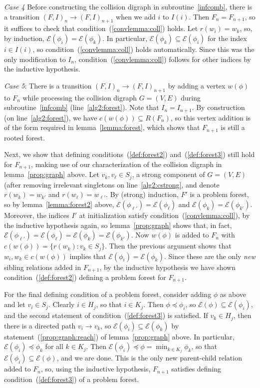 \documentclass[11pt,reqno]{amsart}
\theoremstyle{definition}
\numberwithin{equation}{section}
\newcommand{\pre}{\phi}
\newcommand{\sub}{\subseteq}
\newcommand{\fix}{\mathcal{E}}
\newcommand{\peq}{\preceq}
\newcommand{\strongcomp}{S}
\newcommand{\coll}{I}
\newcommand{\reach}{H}
\newcommand{\forest}{F}
\newcommand{\pair}{(F,I)}
\newcommand{\roott}{R}
\begin{document}
\emph{Case 4} Before constructing the collision digraph in subroutine~\ref{infcomb}, there is a transition $\pair_n \to \pair_{n + 1}$ when we add $i$ to $\coll(i)$. 
Then $\forest_n = \forest_{n + 1}$, so it suffices to check that condition~(\ref{convlemma:coll}) holds. 
Let $r(w_i) = w_k$, so, by induction, $\fix(\pre_i) = \fix(\pre_k)$. 
In particular, $\fix(\pre_k) \sub \fix(\pre_i)$ for the index $i \in \coll(i)$, so condition~(\ref{convlemma:coll}) holds automatically.
Since this was the only modification to $\coll_n$, condition~(\ref{convlemma:coll}) follows for other indices by the inductive hypothesis.

\emph{Case 5}: There is a transition $\pair_n \to \pair_{n + 1}$ by adding a vertex $w(\pre)$ to $\forest_n$ while processing the collision digraph $G = (V,E)$ during subroutine~\ref{infcomb} (line~\ref{alg2:forest}).
Note that $\coll_n = \coll_{n + 1}$. 
By construction (on line~\ref{alg2:forest}), we have $c(w(\pre)) \sub \roott(\forest_n)$, so this vertex addition is of the form required in lemma~\ref{lemma:forest}, which shows that $\forest_{n + 1}$ is still a rooted forest.  

Next, we show that defining conditions~(\ref{def:forest2}) and~(\ref{def:forest3}) still hold for $\forest_{n + 1}$, making use of our characterization of the collision digraph in lemma~\ref{prop:graph} above.
Let $v_k, v_{\ell} \in \strongcomp_j$, a strong component of $G = (V,E)$ (after removing irrelevant singletons on line~\ref{alg2:cstrong}, and denote $r(w_k) = w_{k'}$ and $r(w_{\ell}) = w_{\ell'}$.
By (strong) induction, $\forest'$ is a problem forest, so by lemma~\ref{lemma:forest2} above, $\fix(\pre_{\ell'}) = \fix(\pre_{\ell})$ and $\fix(\pre_k) = \fix(\pre_{k'})$. 
Moreover, the indices $\coll'$ at initialization satisfy condition~(\ref{convlemma:coll}), by the inductive hypothesis again, so lemma~\ref{prop:graph} shows that, in fact, $\fix(\pre_{\ell'}) = \fix(\pre_{\ell}) = \fix(\pre_k) = \fix(\pre_{k'})$. 
Now $w(\pre)$ is added to $\forest_n$ with $c(w(\pre)) = \{r(w_k):v_k \in \strongcomp_j\}$. 
Then the previous argument shows that $w_i,w_k \in c(w(\pre))$ implies that $\fix(\pre_i) = \fix(\pre_k)$. 
Since these are the only \emph{new} sibling relations added in $\forest_{n+1}$, by the inductive hypothesis we have shown condition~(\ref{def:forest2}) defining a problem forest for $\forest_{n+1}$. 

For the final defining condition of a problem forest, consider adding $\pre$ as above and let $v_i \in \strongcomp_j$. 
Clearly $i \in \reach_j$, so that $i \in K_j$. 
Then $\pre \peq \pre_i$, so $\fix(\pre) \sub \fix(\pre_i)$, and the second statement of condition~(\ref{def:forest3}) is satisfied. 
If $v_k \in \reach_j$, then there is a directed path $v_i \to v_k$, so $\fix(\pre_i) \sub \fix(\pre_k)$ by statement~(\ref{prop:graph:reach}) of lemma~\ref{prop:graph} above.
In particular, $\fix(\pre_i) \peq \pre_k$ for all $k \in K_j$. 
Then $\fix(\pre_i) \peq \pre = \min_{k \in K_j} \pre_k$, so that $\fix(\pre_i) \sub \fix(\pre)$, and we are done. 
This is the only new parent-child relation added to $\forest_n$, so, using the inductive hypothesis, $\forest_{n+1}$ satisfies defining condition~(\ref{def:forest3}) of a problem forest. 
\end{document}

